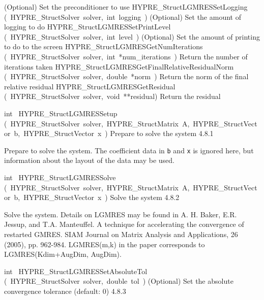 \documentclass{article}
\begin{document}
\begin{cxxentry}
\begin{cxxentry}
\begin{cxxnames}
        {
(Optional) Set the preconditioner to use}
        {}
\label{cxx.4.8.10}
        {HYPRE\_StructLGMRESSetLogging}
        {(\ HYPRE\_StructSolver\ solver,\ int\ logging\ )}
        {
(Optional) Set the amount of logging to do}
        {}
\label{cxx.4.8.11}
        {HYPRE\_StructLGMRESSetPrintLevel}
        {(\ HYPRE\_StructSolver\ solver,\ int\ level\ )}
        {
(Optional) Set the amount of printing to do to the screen}
        {}
\label{cxx.4.8.12}
        {HYPRE\_StructLGMRESGetNumIterations}
        {(\ HYPRE\_StructSolver\ solver,\ int\ *num\_iterations\ )}
        {
Return the number of iterations taken}
        {}
\label{cxx.4.8.13}
        {HYPRE\_StructLGMRESGetFinalRelativeResidualNorm}
        {(\ HYPRE\_StructSolver\ solver,\ double\ *norm\ )}
        {
Return the norm of the final relative residual}
        {}
\label{cxx.4.8.14}
        {HYPRE\_StructLGMRESGetResidual}
        {(\ HYPRE\_StructSolver\ solver,\ void\ **residual)}
        {
Return the residual}
        {}
\label{cxx.4.8.15}
\end{cxxnames}
\begin{cxxfunction}
{int\ }
        {HYPRE\_StructLGMRESSetup}
        {(\ HYPRE\_StructSolver\ solver,\ HYPRE\_StructMatrix\ A,\ HYPRE\_StructVector\ b,\ HYPRE\_StructVector\ x\ )}
        {
Prepare to solve the system}
        {4.8.1}
\begin{cxxdoc}

Prepare to solve the system.  The coefficient data in {\tt b} and {\tt x} is
ignored here, but information about the layout of the data may be used.
\end{cxxdoc}
\end{cxxfunction}
\begin{cxxfunction}
{int\ }
        {HYPRE\_StructLGMRESSolve}
        {(\ HYPRE\_StructSolver\ solver,\ HYPRE\_StructMatrix\ A,\ HYPRE\_StructVector\ b,\ HYPRE\_StructVector\ x\ )}
        {
Solve the system}
        {4.8.2}
\begin{cxxdoc}

Solve the system. Details on LGMRES may be found in A. H. Baker,
E.R. Jessup, and T.A. Manteuffel. A technique for accelerating the
convergence of restarted GMRES. SIAM Journal on Matrix Analysis and
Applications, 26 (2005), pp. 962-984. LGMRES(m,k) in the paper
corresponds to LGMRES(Kdim+AugDim, AugDim).
\end{cxxdoc}
\end{cxxfunction}
\begin{cxxfunction}
{int\ }
        {HYPRE\_StructLGMRESSetAbsoluteTol}
        {(\ HYPRE\_StructSolver\ solver,\ double\ tol\ )}
        {
(Optional) Set the absolute convergence tolerance (default: 0) }
        {4.8.3}
\begin{cxxdoc}


\end{cxxdoc}
\end{cxxfunction}
\end{cxxentry}
\end{cxxentry}
\end{document}

